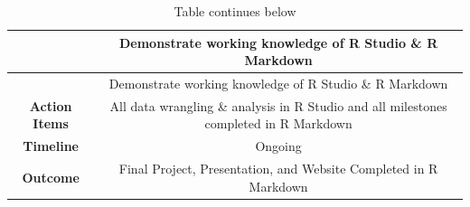 \documentclass[]{elsarticle} %
\begin{document}
\begin{longtable}[]{@{}cc@{}}
\caption{Table continues below}\tabularnewline
\toprule
\begin{minipage}[b]{0.25\columnwidth}\centering\strut
~\strut
\end{minipage} & \begin{minipage}[b]{0.42\columnwidth}\centering\strut
Demonstrate working knowledge of R Studio \& R Markdown\strut
\end{minipage}\tabularnewline
\midrule
\endfirsthead
\toprule
\begin{minipage}[b]{0.25\columnwidth}\centering\strut
~\strut
\end{minipage} & \begin{minipage}[b]{0.42\columnwidth}\centering\strut
Demonstrate working knowledge of R Studio \& R Markdown\strut
\end{minipage}\tabularnewline
\midrule
\endhead
\begin{minipage}[t]{0.25\columnwidth}\centering\strut
\textbf{Action Items}\strut
\end{minipage} & \begin{minipage}[t]{0.42\columnwidth}\centering\strut
All data wrangling \& analysis in R Studio and all milestones completed
in R Markdown\strut
\end{minipage}\tabularnewline
\begin{minipage}[t]{0.25\columnwidth}\centering\strut
\textbf{Timeline}\strut
\end{minipage} & \begin{minipage}[t]{0.42\columnwidth}\centering\strut
Ongoing\strut
\end{minipage}\tabularnewline
\begin{minipage}[t]{0.25\columnwidth}\centering\strut
\textbf{Outcome}\strut
\end{minipage} & \begin{minipage}[t]{0.42\columnwidth}\centering\strut
Final Project, Presentation, and Website Completed in R Markdown\strut
\end{minipage}\tabularnewline
\bottomrule
\end{longtable}
\end{document}
